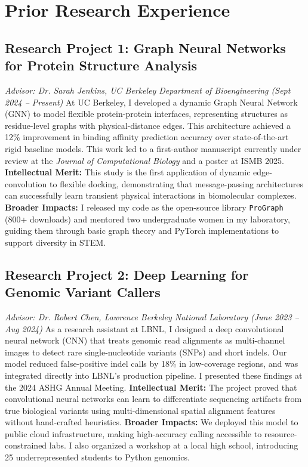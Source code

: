 \section{Prior Research Experience}
\subsection{Research Project 1: Graph Neural Networks for Protein Structure Analysis}
\textit{Advisor: Dr. Sarah Jenkins, UC Berkeley Department of Bioengineering (Sept 2024 -- Present)}
\newpar
At UC Berkeley, I developed a dynamic Graph Neural Network (GNN) to model flexible protein-protein interfaces, representing structures as residue-level graphs with physical-distance edges. This architecture achieved a 12\% improvement in binding affinity prediction accuracy over state-of-the-art rigid baseline models. This work led to a first-author manuscript currently under review at the \textit{Journal of Computational Biology} and a poster at ISMB 2025.
\newpar
\textbf{\textcolor{accent}{Intellectual Merit:}} This study is the first application of dynamic edge-convolution to flexible docking, demonstrating that message-passing architectures can successfully learn transient physical interactions in biomolecular complexes. \textbf{\textcolor{accent}{Broader Impacts:}} I released my code as the open-source library \texttt{ProGraph} (800+ downloads) and mentored two undergraduate women in my laboratory, guiding them through basic graph theory and PyTorch implementations to support diversity in STEM.

\subsection{Research Project 2: Deep Learning for Genomic Variant Callers}
\textit{Advisor: Dr. Robert Chen, Lawrence Berkeley National Laboratory (June 2023 -- Aug 2024)}
\newpar
As a research assistant at LBNL, I designed a deep convolutional neural network (CNN) that treats genomic read alignments as multi-channel images to detect rare single-nucleotide variants (SNPs) and short indels. Our model reduced false-positive indel calls by 18\% in low-coverage regions, and was integrated directly into LBNL's production pipeline. I presented these findings at the 2024 ASHG Annual Meeting.
\newpar
\textbf{\textcolor{accent}{Intellectual Merit:}} The project proved that convolutional neural networks can learn to differentiate sequencing artifacts from true biological variants using multi-dimensional spatial alignment features without hand-crafted heuristics. \textbf{\textcolor{accent}{Broader Impacts:}} We deployed this model to public cloud infrastructure, making high-accuracy calling accessible to resource-constrained labs. I also organized a workshop at a local high school, introducing 25 underrepresented students to Python genomics.
